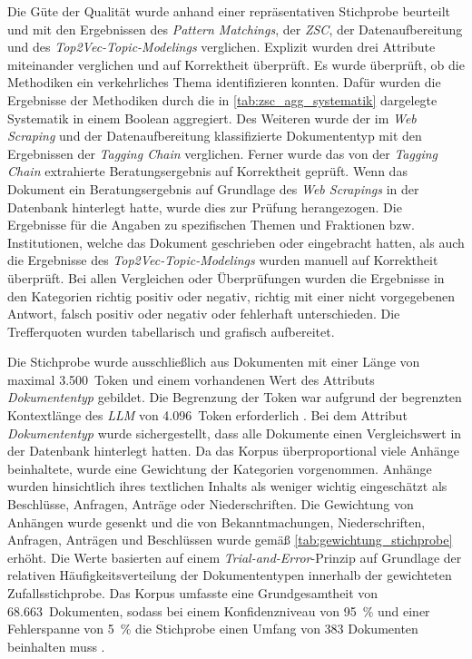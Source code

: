 Die Güte der Qualität wurde anhand einer repräsentativen Stichprobe beurteilt und mit den Ergebnissen des \textit{Pattern Matchings}, der \textit{ZSC}, der Datenaufbereitung und des \textit{Top2Vec-Topic-Modelings} verglichen. Explizit wurden drei Attribute miteinander verglichen und auf Korrektheit überprüft. Es wurde überprüft, ob die Methodiken ein verkehrliches Thema identifizieren konnten. Dafür wurden die Ergebnisse der Methodiken durch die in \autoref{tab:zsc_agg_systematik} dargelegte Systematik in einem Boolean aggregiert. Des Weiteren wurde der im \textit{Web Scraping} und der Datenaufbereitung klassifizierte Dokumententyp mit den Ergebnissen der \textit{Tagging Chain} verglichen. Ferner wurde das von der \textit{Tagging Chain} extrahierte Beratungsergebnis auf Korrektheit geprüft. Wenn das Dokument ein Beratungsergebnis auf Grundlage des \textit{Web Scrapings} in der Datenbank hinterlegt hatte, wurde dies zur Prüfung herangezogen. Die Ergebnisse für die Angaben zu spezifischen Themen und Fraktionen bzw. Institutionen, welche das Dokument geschrieben oder eingebracht hatten, als auch die Ergebnisse des \textit{Top2Vec-Topic-Modelings} wurden manuell auf Korrektheit überprüft. Bei allen Vergleichen oder Überprüfungen wurden die Ergebnisse in den Kategorien richtig positiv oder negativ, richtig mit einer nicht vorgegebenen Antwort, falsch positiv oder negativ oder fehlerhaft unterschieden. Die Trefferquoten wurden tabellarisch und grafisch aufbereitet.

Die Stichprobe wurde ausschließlich aus Dokumenten mit einer Länge von maximal 3.500~Token und einem vorhandenen Wert des Attributs \textit{Dokumententyp} gebildet. Die Begrenzung der Token war aufgrund der begrenzten Kontextlänge des \textit{LLM} von 4.096~Token erforderlich \parencite{openai}. Bei dem Attribut \textit{Dokumententyp} wurde sichergestellt, dass alle Dokumente einen Vergleichswert in der Datenbank hinterlegt hatten. Da das Korpus überproportional viele Anhänge beinhaltete, wurde eine Gewichtung der Kategorien vorgenommen. Anhänge wurden hinsichtlich ihres textlichen Inhalts als weniger wichtig eingeschätzt als Beschlüsse, Anfragen, Anträge oder Niederschriften. Die Gewichtung von Anhängen wurde gesenkt und die von Bekanntmachungen, Niederschriften, Anfragen, Anträgen und Beschlüssen wurde gemäß \autoref{tab:gewichtung_stichprobe} erhöht. Die Werte basierten auf einem \textit{Trial-and-Error}-Prinzip auf Grundlage der relativen Häufigkeitsverteilung der Dokumententypen innerhalb der gewichteten Zufallsstichprobe. Das Korpus umfasste eine Grundgesamtheit von 68.663~Dokumenten, sodass bei einem Konfidenzniveau von 95~\% und einer Fehlerspanne von 5~\% die Stichprobe einen Umfang von 383 Dokumenten beinhalten muss \parencite{walterscheid2022}.

